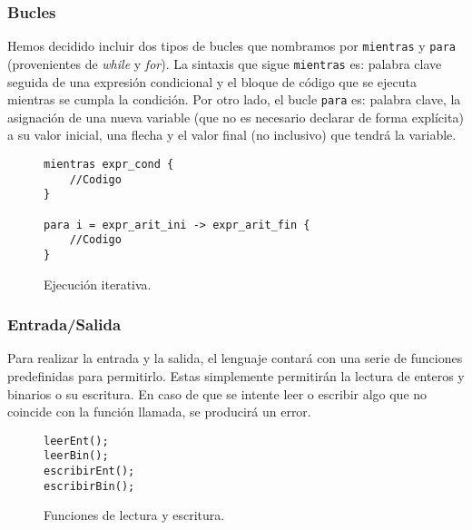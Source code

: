 \subsubsection{Bucles}
Hemos decidido incluir dos tipos de bucles que nombramos por
\lstinline{mientras} y \lstinline{para}
(provenientes de \textit{while} y \textit{for}). La sintaxis que sigue
\lstinline{mientras} es: palabra clave seguida de una expresión condicional y el bloque de
código que se ejecuta mientras se cumpla la condición. Por otro lado, el bucle
\lstinline{para} es: palabra clave, la asignación de una nueva variable (que no es
necesario declarar de forma explícita) a su valor inicial, una flecha y el valor
final (no inclusivo) que tendrá la variable.
\begin{figure}[htbp]
    \centering
    \begin{lstlisting}
mientras expr_cond {
    //Codigo
}

para i = expr_arit_ini -> expr_arit_fin {
    //Codigo
}
    \end{lstlisting}
    \caption{Ejecución iterativa.}
\end{figure}

\subsubsection{Entrada/Salida}
Para realizar la entrada y la salida, el lenguaje contará con una serie de
funciones predefinidas para permitirlo. Estas simplemente permitirán la lectura
de enteros y binarios o su escritura. En caso de que se intente leer o escribir
algo que no coincide con la función llamada, se producirá un error.
\begin{figure}[htbp]
    \centering
    \begin{lstlisting}
leerEnt();
leerBin();
escribirEnt();
escribirBin();
    \end{lstlisting}
    \caption{Funciones de lectura y escritura.}
\end{figure}

